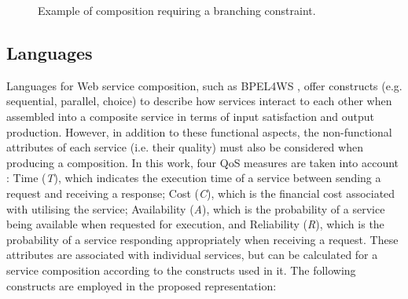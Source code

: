 \documentclass[conference]{IEEEtran}
\begin{document}
\begin{figure}
\centerline{
}
\caption{Example of composition requiring a branching constraint.}
\label{fig:motivation}
\end{figure}


\subsection{Languages}\label{constructs}

Languages for Web service composition, such as BPEL4WS \cite{wohed2003analysis}, offer constructs (e.g. sequential, parallel, choice) to describe how services interact to each other when assembled into a composite 
service in terms of input satisfaction and output production. However, in addition to these functional aspects, the non-functional attributes of each service (i.e. 
their quality) must also be considered when producing a composition. In this work, four QoS measures are taken into account \cite{jaeger2007qos,yu2013adaptive}: Time (\textit{T}), which indicates 
the 
execution time of a service between sending a request and receiving a response; Cost (\textit{C}), which is the financial cost associated with utilising the 
service; Availability (\textit{A}), which is the probability of a service being available when requested for execution, and Reliability (\textit{R}), which is 
the probability of a service responding appropriately when receiving a request. These attributes are associated with individual services, but can be calculated 
for a service composition according to the constructs used in it. The following constructs are employed in the proposed representation: 
\end{document}
